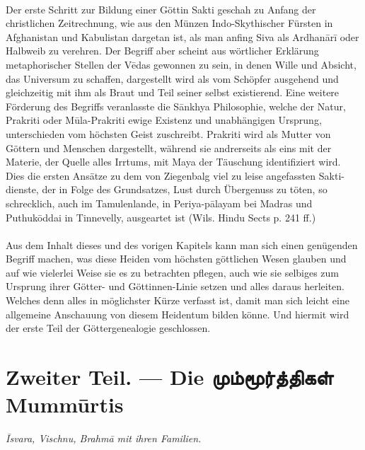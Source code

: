 \documentclass{article}
\newcommand{\TamilBold}[1]{\texttamil{\textbf{#1}}}
\newcommand{\tambold}[1]{\TamilBold{#1}}
\begin{document}
\paragraph{}
Der erste Schritt zur Bildung einer Göttin Sakti geschah zu Anfang der christlichen Zeitrechnung, wie aus den Münzen Indo-Skythischer Fürsten in Afghanistan und Kabulistan dargetan ist, als man anfing Siva als Ardhan\={a}r\={i} oder Halbweib zu verehren. Der Begriff aber scheint aus wörtlicher Erklärung metaphorischer Stellen der V\={e}das gewonnen zu sein, in denen Wille und Absicht, das Universum zu schaffen, dargestellt wird als vom Schöpfer ausgehend und gleichzeitig mit ihm als Braut und Teil seiner selbst existierend. Eine weitere Förderung des Begriffs veranlasste die S\={a}nkhya Philosophie, welche der Natur, Prakriti oder M\={u}la-Prakriti ewige Existenz und unabhängigen Ursprung, unterschieden vom höchsten Geist zuschreibt. Prakriti wird als Mutter von Göttern und Menschen dargestellt, während sie andrerseits als eins mit der Materie, der Quelle alles Irrtums, mit Maya der Täuschung identifiziert wird. Dies die ersten Ansätze zu dem von Ziegenbalg viel zu leise angefassten Sakti-dienste, der in Folge des Grundsatzes, Lust durch Übergenuss zu töten, so schrecklich, auch im Tamulenlande, in Periya-p\={a}layam bei Madras und Puthuk\={o}ddai in Tinnevelly, ausgeartet ist (Wils. Hindu Sects p. 241 ff.)

\begin{center}
\end{center}
\paragraph{}
Aus dem Inhalt dieses und des vorigen Kapitels kann man sich einen genügenden Begriff machen, was diese Heiden vom höchsten göttlichen Wesen glauben und auf wie vielerlei Weise sie es zu betrachten pflegen, auch wie sie selbiges zum Ursprung ihrer Götter- und Göttinnen-Linie setzen und alles daraus herleiten. Welches denn alles in möglichster Kürze verfasst ist, damit man sich leicht eine allgemeine Anschauung von diesem Heidentum bilden könne. Und hiermit wird der erste Teil der Göttergenealogie geschlossen.

\clearpage
\section{\textgerman{Zweiter Teil. — Die} \tambold{மும்மூர்த்திகள்} \textgerman{Mumm\={u}rtis}}
\begin{center}
\emph{\={I}svara, Vischnu, Brahm\={a} mit ihren Familien.}
\end{center}
\end{document}
